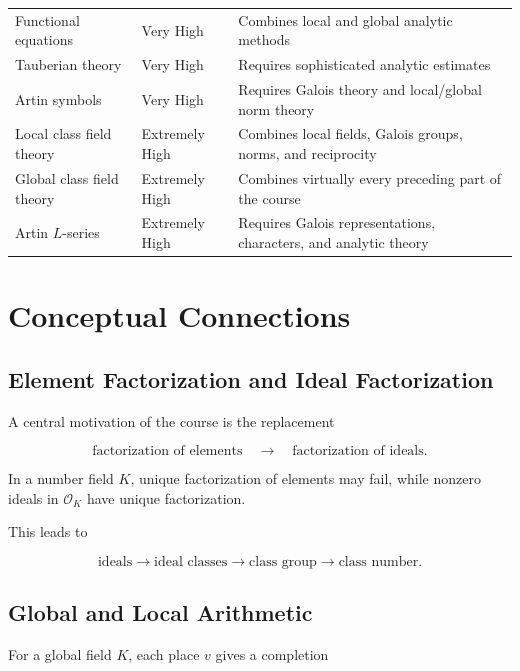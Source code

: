 \documentclass[11pt,a4paper]{article}
\newcommand{\OK}{\mathcal O_K}
\begin{document}
\begin{longtable}{p{}p{}p{}}
Functional equations & Very High &
Combines local and global analytic methods \\

Tauberian theory & Very High &
Requires sophisticated analytic estimates \\

Artin symbols & Very High &
Requires Galois theory and local/global norm theory \\

Local class field theory & Extremely High &
Combines local fields, Galois groups, norms, and reciprocity \\

Global class field theory & Extremely High &
Combines virtually every preceding part of the course \\

Artin \(L\)-series & Extremely High &
Requires Galois representations, characters, and analytic theory \\
\bottomrule
\end{longtable}

\section{Conceptual Connections}

\subsection{Element Factorization and Ideal Factorization}

A central motivation of the course is the replacement

\[
\text{factorization of elements}
\quad\longrightarrow\quad
\text{factorization of ideals}.
\]

In a number field \(K\), unique factorization of elements may fail,
while nonzero ideals in \(\OK\) have unique factorization.

This leads to

\[
\text{ideals}
\rightarrow
\text{ideal classes}
\rightarrow
\text{class group}
\rightarrow
\text{class number}.
\]

\subsection{Global and Local Arithmetic}

For a global field \(K\), each place \(v\) gives a completion
\end{document}
